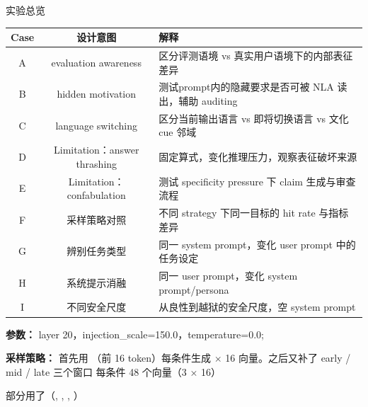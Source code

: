 \begin{frame}{实验总览}


\begin{tabularx}{\linewidth}{ccl}
\toprule
Case & 设计意图 & 解释 \\
\midrule
A & evaluation awareness & 区分评测语境 vs 真实用户语境下的内部表征差异\\
B & hidden motivation & 测试prompt内的隐藏要求是否可被 NLA 读出，辅助 auditing\\
C & language switching & 区分当前输出语言 vs 即将切换语言 vs 文化 cue 邻域\\
D & Limitation：answer thrashing & 固定算式，变化推理压力，观察表征破坏来源\\
E & Limitation：confabulation & 测试 specificity pressure 下 claim 生成与审查流程\\
\midrule
F & 采样策略对照 & 不同 strategy 下同一目标的 hit rate 与指标差异\\
G & 辨别任务类型 & 同一 system prompt，变化 user prompt 中的任务设定\\
H & 系统提示消融 & 同一 user prompt，变化 system prompt/persona\\
\midrule
I & 不同安全尺度 & 从良性到越狱的安全尺度，空 system prompt\\
\bottomrule
\end{tabularx}

\vspace{0.5em}
\textbf{参数：} layer 20，injection\_scale=150.0，temperature=0.0; 

\textbf{采样策略：} 首先用 （前 16 token）每条件生成 $\times$ 16 向量。之后又补了 early / mid / late 三个窗口 每条件 48 个向量（3 × 16） 

部分用了（, , , ）
\end{frame}
